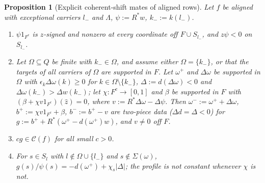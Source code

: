 \documentclass[10pt]{amsart}
\newtheorem{proposition}[theorem]{Proposition}
\theoremstyle{definition}
\theoremstyle{remark}
\newcommand{\Cset}{\mathcal C}
\newcommand{\zh}{\hat z}
\begin{document}
\begin{proposition}[Explicit coherent-shift mates of aligned rows]\label{prop:II-NTM}
Let $f$ be aligned with exceptional carriers $l_-$ and $\Lambda$, $\psi:=R^*w$, $k_-:=k(l_-)$.
\begin{enumerate}
\item[(i)] $\psi1_{F^c}$ is $z$-signed and nonzero at every coordinate off $F\cup S_{l_-}$,
and $z\psi<0$ on $S_{l_-}$.
\item[(ii)] Let $\Omega\subseteq Q$ be finite with $k_-\in\Omega$, and assume either $\Omega=\{k_-\}$, or
that the targets of all carriers of $\Omega$ are supported in $F$.  Let $\omega^+$ and
$\Delta\omega$ be supported in $\Omega$ with $\epsilon_k\Delta\omega(k)\ge0$ for $k\in\Omega\setminus\{k_-\}$,
$\Delta:=d(\Delta\omega)<0$ and $\Delta\omega(k_-)>\Delta w(k_-)$; let $\chi:F^c\to[0,1]$ and $\beta$ be
supported in $F$ with $(\beta+\chi v1_{F^c})(\zh)=0$, where $v:=R^*\Delta\omega-\Delta\psi$.  Then
$\omega^-:=\omega^++\Delta\omega$, $b^+:=\chi v1_{F^c}+\beta$, $b^-:=b^+-v$ are two-piece data
\textup{(}$\Delta d=\Delta<0$\textup{)} for $g:=b^++R^*(\omega^+-d(\omega^+)w)$, and $v\ne0$ off $F$.
\item[(iii)] $cg\in\Cset(f)$ for all small $c>0$.
\item[(iv)] For $s\in S_l$ with $l\notin\Omega\cup\{l_-\}$ and $s\notin\Sigma(\omega)$, $g(s)/\psi(s)=-d(\omega^+)
+\chi_s|\Delta|$; the profile is not constant whenever $\chi$ is not.
\end{enumerate}
\end{proposition}
\end{document}
